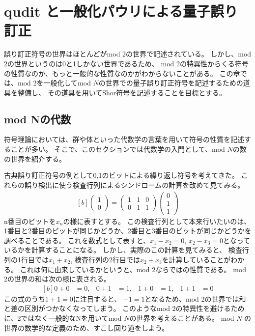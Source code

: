 \documentclass[../master.tex]{subfiles}
\begin{document}
\chapter{qudit と一般化パウリによる量子誤り訂正}
誤り訂正符号の世界はほとんどがmod 2の世界で記述されている。
しかし、mod 2の世界というのは0と1しかない世界であるため、
mod 2の特異性からくる符号の性質なのか、もっと一般的な性質なのかがわからないことがある。
この章では、mod 2を一般化してmod $N$の世界での量子誤り訂正符号を記述するための道具を整備し、
その道具を用いてShor符号を記述することを目標とする。

\section{mod Nの代数}
符号理論においては、群や体といった代数学の言葉を用いて符号の性質を記述することが多い。
そこで、このセクションでは代数学の入門として、mod $N$の数の世界を紹介する。

古典誤り訂正符号の例として0,1のビットによる繰り返し符号を考えてきた。
これらの誤り検出に使う検査行列によるシンドロームの計算を改めて見てみる。
\begin{equation}\begin{aligned}[b]
\begin{pmatrix}
    1 \\ 0
\end{pmatrix}=
\begin{pmatrix}
    1 & 1 & 0 \\
    0 & 1 & 1
\end{pmatrix}
\begin{pmatrix}
    0 \\
    1 \\
    1
\end{pmatrix}
\end{aligned}\end{equation}
n番目のビットを$x_n$の様に表すとする。
この検査行列として本来行いたいのは、
1番目と2番目のビットが同じかどうか、2番目と3番目のビットが同じかどうかを調べることである。
これを数式として表すと、$x_1-x_2=0$, $x_2-x_3=0$となっているかを計算することになる。
しかし、実際のこの計算を見てみると、
検査行列の1行目では$x_1+x_2$,
検査行列の2行目では$x_2+x_3$を計算していることがわかる。
これは何に由来しているかというと、mod 2ならではの性質である。
mod 2の世界の和は次の様に表される。
\begin{equation}\begin{aligned}[b]
    0 + 0 &= 0, & 0 + 1 &= 1, & 1 + 0 &= 1, & 1 + 1 &= 0
\end{aligned}\end{equation}
この式のうち$1+1=0$に注目すると、
$-1 = 1$となるため、mod 2の世界では和と差の区別がつかなくなってしまう。
このようなmod 2の特異性を避けるために、2ではなく一般的なNを用いてmod $N$の世界を考えることがある。
mod $N$ の世界の数学的な定義のため、すこし回り道をしよう。
\end{document}
